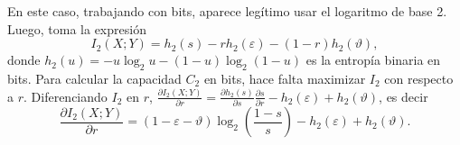 En este caso, trabajando con bits,  aparece leg\'itimo usar el logaritmo de base
2. Luego, 
toma la expresi\'on
%
\[
I_2(X;Y) = h_2(s) - r h_2(\varepsilon) - (1-r) h_2(\vartheta),
\]
%
donde $h_2(u) = -  u \log_2 u - (1-u) \log_2 (1-u)$  es la entrop\'ia binaria en
bits.  Para calcular la capacidad $C_2$  en bits, hace falta maximizar $I_2$ con
respecto   a   $r$.    Diferenciando    $I_2$   en   $r$,   \ie   $\frac{\partial
  I_2(X;Y)}{\partial  r}  =  \frac{\partial h_2(s)}{\partial  s}  \frac{\partial
  s}{\partial r} - h_2(\varepsilon) + h_2(\vartheta)$, es decir
%
\[
\frac{\partial I_2(X;Y)}{\partial  r} = (1-\varepsilon-\vartheta)  \log_2 \left(
  \frac{1-s}{s} \right) - h_2(\varepsilon) + h_2(\vartheta).
\]
%
